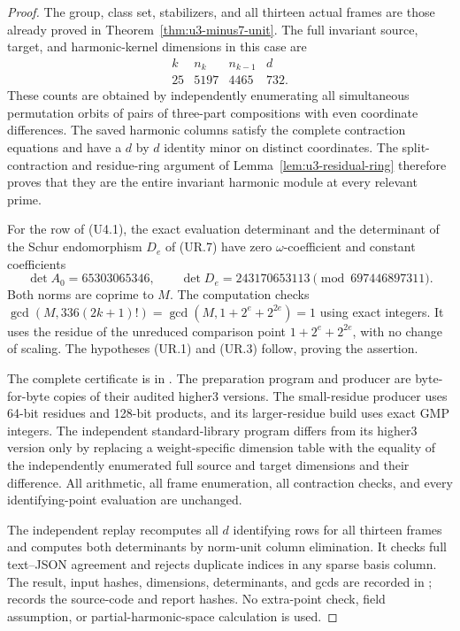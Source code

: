 \documentclass[11pt,a4paper]{article}
\theoremstyle{definition}
\begin{document}
\begin{proof}
The group, class set, stabilizers, and all thirteen actual frames
are those already proved in Theorem~\ref{thm:u3-minus7-unit}.
The full invariant source, target, and harmonic-kernel dimensions
in this case are
\[
 \begin{array}{c|r|r|r}
 k&n_k&n_{k-1}&d\\ \hline
 25&5197&4465&732.
 \end{array}
 \tag{U4.2}
\]
These counts are obtained by independently enumerating all
simultaneous permutation orbits of pairs of three-part
compositions with even coordinate differences. The saved
harmonic columns satisfy the complete contraction equations
and have a $d$ by $d$ identity minor on distinct coordinates.
The split-contraction and residue-ring argument of
Lemma~\ref{lem:u3-residual-ring} therefore proves that they are
the entire invariant harmonic module at every relevant prime.

For the row of (U4.1), the exact evaluation determinant and
the determinant of the Schur endomorphism $D_e$ of (UR.7)
have zero $\omega$-coefficient and constant coefficients
\[
 \det A_0=65303065346,\qquad
 \det D_e=243170653113\pmod {697446897311}.
 \tag{U4.3}
\]
Both norms are coprime to $M$. The computation checks
$\gcd(M,336(2k+1)!)=\gcd(M,1+2^e+2^{2e})=1$
using exact integers. It uses the residue of the unreduced
comparison point $1+2^e+2^{2e}$, with no change of scaling.
The hypotheses (UR.1) and (UR.3) follow, proving the assertion.

The complete certificate is in
. The preparation program
 and producer
 are byte-for-byte copies
of their audited higher3 versions. The small-residue producer
uses 64-bit residues and 128-bit products, and its larger-residue
build uses exact GMP integers. The independent standard-library
program  differs from its higher3
version only by replacing a weight-specific dimension table
with the equality of the independently enumerated full source
and target dimensions and their difference. All arithmetic,
all frame enumeration, all contraction checks, and every
identifying-point evaluation are unchanged.

The independent replay recomputes all $d$ identifying rows
for all thirteen frames and computes both determinants by
norm-unit column elimination. It checks full text--JSON
agreement and rejects duplicate indices in any sparse basis
column. The result, input hashes, dimensions, determinants,
and gcds are recorded in
;
 records the source-code and
report hashes. No extra-point check, field assumption, or
partial-harmonic-space calculation is used.
\end{proof}
\end{document}
